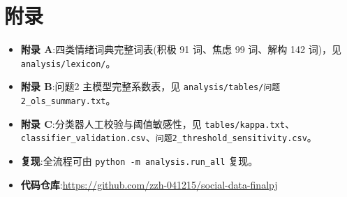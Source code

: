 \documentclass[11pt,a4paper]{ctexart}
\begin{document}
\appendix
\section{附录}
\begin{itemize}[leftmargin=1.6em,itemsep=1pt]
  \item \textbf{附录 A}:四类情绪词典完整词表(积极 91 词、焦虑 99 词、解构 142 词)，见 \texttt{analysis/lexicon/}。
  \item \textbf{附录 B}:问题2 主模型完整系数表，见 \texttt{analysis/tables/问题2\_ols\_summary.txt}。
  \item \textbf{附录 C}:分类器人工校验与阈值敏感性，见 \texttt{tables/kappa.txt}、\texttt{classifier\_validation.csv}、\texttt{问题2\_threshold\_sensitivity.csv}。
  \item \textbf{复现}:全流程可由 \texttt{python -m analysis.run\_all} 复现。
  \item \textbf{代码仓库}:\url{https://github.com/zzh-041215/social-data-finalpj}
\end{itemize}
\end{document}
